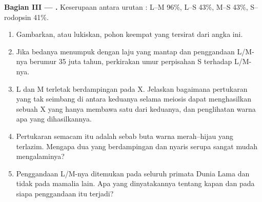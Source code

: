 \begin{problem}
\medskip
\noindent\textbf{Bagian III --- .}
Keserupaan antara urutan  : L--M 96\%, L--S 43\%, M--S
43\%, S--rodopsin 41\%.
\begin{enumerate}[resume]
  \item Gambarkan, atau lukiskan, pohon keempat  yang tersirat
        dari angka ini.
  \item Jika bedanya menumpuk dengan laju yang mantap dan penggandaan
        L/M-nya berumur 35 juta tahun, perkirakan umur perpisahan S
        terhadap L/M-nya.
  \item {} L dan M terletak berdampingan pada  X. Jelaskan
        bagaimana pertukaran yang tak seimbang di antara keduanya
        selama meiosis dapat menghasilkan sebuah X yang hanya membawa
        satu dari keduanya, dan penglihatan warna apa yang dihasilkannya.
  \item Pertukaran semacam itu adalah sebab buta warna merah--hijau
        yang terlazim. Mengapa dua  yang berdampingan dan nyaris
        serupa sangat mudah mengalaminya?
  \item Penggandaan L/M-nya ditemukan pada seluruh primata Dunia Lama
        dan tidak pada mamalia lain. Apa yang dinyatakannya tentang
        kapan dan pada siapa penggandaan itu terjadi?
\end{enumerate}


\end{problem}

